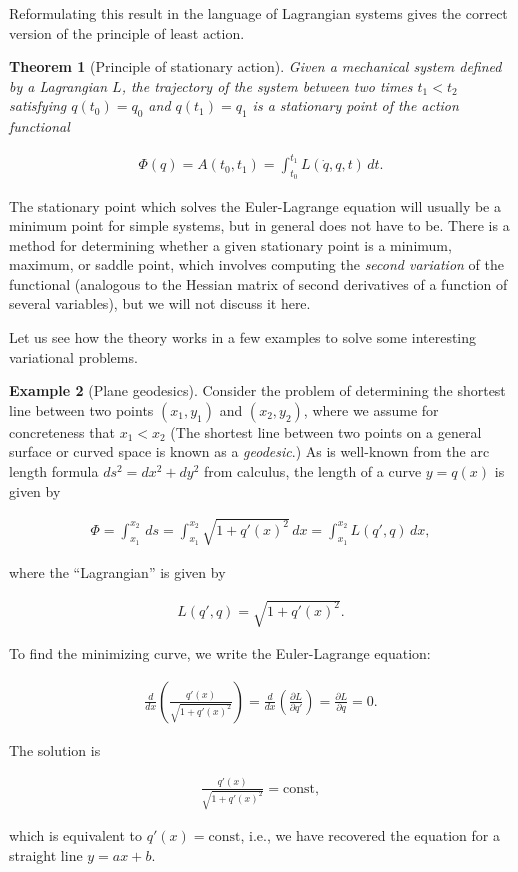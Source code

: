 \documentclass[11pt]{report}
\theoremstyle{plain}
\newtheorem{thm}{Theorem}[chapter]
\theoremstyle{definition}
\newtheorem{example}[thm]{Example}
\begin{document}
Reformulating this result in the language of
Lagrangian systems gives the correct version of the
principle of least action.

\begin{thm}[Principle of stationary action]
Given a mechanical system defined by a Lagrangian $L$,
the trajectory of the system between two times
$t_1<t_2$ satisfying $q(t_0)=q_0$ and $q(t_1)=q_1$ is
a stationary point of the action functional

\begin{align*}
\Phi(q) = A(t_0,t_1) = \int_{t_0}^{t_1} L(\dot{q},q,t)\,dt.
\end{align*}

\end{thm}

The stationary point which solves the Euler-Lagrange
equation will usually be a minimum point for simple
systems, but in general does not have to be. There is
a method for determining whether a given stationary
point is a minimum, maximum, or saddle point, which
involves computing the \emph{second variation} of the
functional (analogous to the Hessian matrix of second
derivatives of a function of several variables), but
we will not discuss it here.

Let us see how the theory works in a few examples to
solve some interesting variational problems.

\begin{example}[Plane geodesics]
Consider the problem of determining the shortest line
between two points $(x_1,y_1)$ and $(x_2,y_2)$, where
we assume for concreteness that $x_1<x_2$ (The
shortest line between two points on a general surface
or curved space is known as a \emph{geodesic}.) As is
well-known from the arc length formula
$ds^2=dx^2+dy^2$ from calculus, the length of a curve
$y=q(x)$ is given by

\begin{align*}
\Phi = \int_{x_1}^{x_2} \,ds = \int_{x_1}^{x_2} \sqrt{1+q'(x)^2}\,dx
= \int_{x_1}^{x_2} L(q',q)\,dx,
\end{align*}

where the ``Lagrangian'' is given by

\begin{align*}
L(q',q) = \sqrt{1+q'(x)^2}.
\end{align*}

To find the minimizing curve, we write the
Euler-Lagrange equation:

\begin{align*}
\frac{d}{dx} \left(\frac{q'(x)}{\sqrt{1+q'(x)^2}}\right) = \frac{d}{dx}\left( \frac{\partial L}{\partial q'} \right) = \frac{\partial L}{\partial q} = 0.
\end{align*}

The solution is

\begin{align*}
\frac{q'(x)}{\sqrt{1+q'(x)^2}} = \textrm{const},
\end{align*}

which is equivalent to $q'(x)=\textrm{const}$, i.e.,
we have recovered the equation for a straight line
$y=ax+b$.
\end{example}
\end{document}
